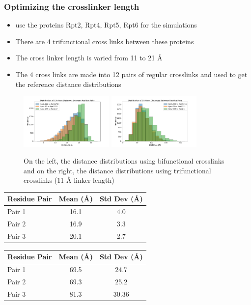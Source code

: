 \documentclass[a4paper,8pt]{beamer}
\begin{document}
\begin{frame}
\frametitle{Optimizing the crosslinker length}
\begin{block}{}
\begin{itemize}
  \item use the proteins Rpt2, Rpt4, Rpt5, Rpt6 for the simulations
  \item There are 4 trifunctional cross links between these proteins
  \item The cross linker length is varied from 11 to 21 {\AA}
  \item The 4 cross links are made into 12 pairs of regular crosslinks and used to get the reference distance distributions
\end{itemize}
\end{block}
\begin{figure}
\centering
\includegraphics[width=0.41\textwidth]{test-figures/only-bi.pdf}
\includegraphics[width=0.41\textwidth]{test-figures/only-tri.pdf}
\caption{On the left, the distance distributions using bifunctional crosslinks and 
on the right, the distance distributions using trifunctional crosslinks (11 {\AA} linker length)}
\end{figure}
%
\begin{minipage}{0.48\textwidth}
  \centering
  \begin{tabular}{lcc}
  \hline
  Residue Pair & Mean (Å) & Std Dev (Å) \\
  \hline
  Pair 1 & 16.1 & 4.0 \\
  Pair 2 & 16.9 & 3.3 \\
  Pair 3 & 20.1 & 2.7 \\
  \hline
  \end{tabular}
  \end{minipage}
  \hfill
  \begin{minipage}{0.48\textwidth}
  \centering
  \begin{tabular}{lcc}
  \hline
  Residue Pair & Mean (Å) & Std Dev (Å) \\
  \hline
  Pair 1 & 69.5 & 24.7 \\
  Pair 2 & 69.3 & 25.2 \\
  Pair 3 & 81.3 & 30.36 \\
  \hline
  \end{tabular}
  \end{minipage}
\end{frame}
\end{document}
